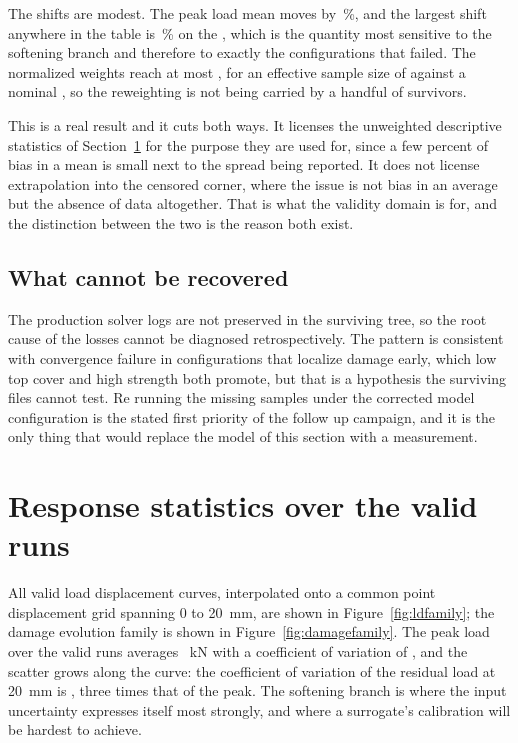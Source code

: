 \documentclass[11pt,a4paper]{article}
\begin{document}
\begin{table}[tbp]
\centering
\caption{Headline quantities of interest over the \WeightNSamples{} valid runs, unweighted against inverse probability of completion weighted. The shift column is the relative change in the mean.}
\label{tab:weighting}

\end{table}

The shifts are modest. The peak load mean moves by \WeightPeakShift\,\%, and the largest shift anywhere in the table is \WeightLargestShift\,\% on the \WeightLargestQoI{}, which is the quantity most sensitive to the softening branch and therefore to exactly the configurations that failed. The normalized weights reach at most \WeightMax{}, for an effective sample size of \WeightESS{} against a nominal \WeightNSamples{}, so the reweighting is not being carried by a handful of survivors.

This is a real result and it cuts both ways. It licenses the unweighted descriptive statistics of Section~\ref{sec:stats} for the purpose they are used for, since a few percent of bias in a mean is small next to the spread being reported. It does not license extrapolation into the censored corner, where the issue is not bias in an average but the absence of data altogether. That is what the validity domain is for, and the distinction between the two is the reason both exist.

\subsection{What cannot be recovered}
The production solver logs are not preserved in the surviving tree, so the root cause of the \NMissing{} losses cannot be diagnosed retrospectively. The pattern is consistent with convergence failure in configurations that localize damage early, which low top cover and high strength both promote, but that is a hypothesis the surviving files cannot test. Re running the missing samples under the corrected model configuration is the stated first priority of the follow up campaign, and it is the only thing that would replace the model of this section with a measurement.

\section{Response statistics over the valid runs}
\label{sec:stats}
All \NValid{} valid load displacement curves, interpolated onto a common \GridPoints{} point displacement grid spanning 0 to 20~mm, are shown in Figure~\ref{fig:ldfamily}; the damage evolution family is shown in Figure~\ref{fig:damagefamily}. The peak load over the valid runs averages \QoIPeakMeanKN~kN with a coefficient of variation of \QoIPeakCoV, and the scatter grows along the curve: the coefficient of variation of the residual load at 20~mm is \QoIResidualCoV, three times that of the peak. The softening branch is where the input uncertainty expresses itself most strongly, and where a surrogate's calibration will be hardest to achieve.
\end{document}
